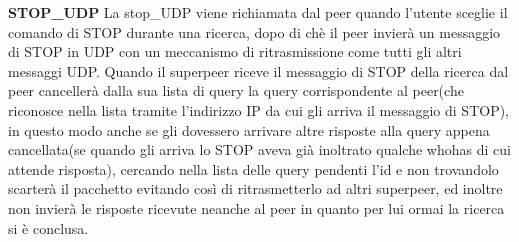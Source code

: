 \textbf{STOP\_UDP} \linebreak
La stop\_UDP viene richiamata dal peer quando l'utente sceglie il comando di STOP durante una ricerca, dopo di chè il peer invierà un messaggio di STOP in UDP con un meccanismo di ritrasmissione come tutti gli altri messaggi UDP. Quando il superpeer riceve il messaggio di STOP della ricerca dal peer cancellerà dalla sua lista di query la query corrispondente al peer(che riconosce nella lista tramite l'indirizzo IP da cui gli arriva il messaggio di STOP), in questo modo anche se gli dovessero arrivare altre risposte alla query appena cancellata(se quando gli arriva lo STOP aveva già inoltrato qualche whohas di cui attende risposta), cercando nella lista delle query pendenti l'id e non trovandolo 
scarterà il pacchetto evitando così di ritrasmetterlo ad altri superpeer, ed inoltre non invierà le risposte ricevute neanche al peer in quanto per lui ormai la ricerca si è conclusa.\linebreak